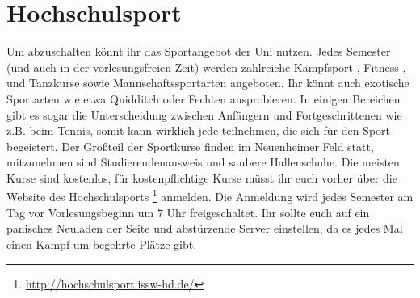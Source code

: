 \section{Hochschulsport}
Um abzuschalten könnt ihr das Sportangebot der Uni nutzen. Jedes Semester (und auch in der vorlesungsfreien Zeit) werden zahlreiche Kampfsport-, Fitness-, und Tanzkurse sowie Mannschaftssportarten angeboten. Ihr könnt auch exotische Sportarten wie etwa Quidditch oder Fechten ausprobieren. In einigen Bereichen gibt es sogar die Unterscheidung zwischen Anfängern und Fortgeschrittenen wie z.B. beim Tennis, somit kann wirklich jede teilnehmen, die sich für den Sport begeistert.
Der Großteil der Sportkurse finden im Neuenheimer Feld statt, mitzunehmen sind Studierendenausweis und saubere Hallenschuhe.
Die meisten Kurse sind kostenlos, für kostenpflichtige Kurse müsst ihr euch vorher über die Website des Hochschulsports \footnote{\url{http://hochschulsport.issw-hd.de/}} anmelden. Die Anmeldung wird jedes Semester am Tag vor Vorlesungsbeginn um 7 Uhr freigeschaltet. Ihr sollte euch auf ein panisches Neuladen der Seite und abstürzende Server einstellen, da es jedes Mal einen Kampf um begehrte Plätze gibt.
